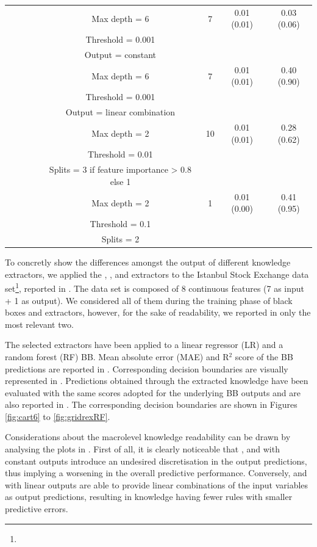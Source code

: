 \documentclass[sigconf]{acmart}
\begin{document}
\begin{table}[t]
\begin{tabular}{cccccccc}
		& & & \creepy{} & Max depth = 6 & 7 & 0.01 (0.01) & 0.03 (0.06) \\
		& & & & Threshold = 0.001 & & & \\
		& & & & Output = constant & & & \\
		\cmidrule(lr){4-8}
		& & & \creepy{} & Max depth = 6 & 7 & 0.01 (0.01) & 0.40 (0.90) \\
		& & & & Threshold = 0.001 & & & \\
		& & & & Output = linear combination & & & \\
		\cmidrule(lr){4-8}
		& & & \gridex{} & Max depth = 2 & 10 & 0.01 (0.01) & 0.28 (0.62) \\
		& & & & Threshold = 0.01 & & & \\
		& & & & Splits = 3 if feature importance > 0.8 else 1 & & & \\
		\cmidrule(lr){4-8}
		& & & \gridrex{} & Max depth = 2 & 1 & 0.01 (0.00) & 0.41 (0.95) \\
		& & & & Threshold = 0.1 & & & \\
		& & & & Splits = 2 & & & \\
		\bottomrule
	\end{tabular}
\end{table}

To concretly show the differences amongst the output of different knowledge extractors, we applied the \cart{}, \creepy{}, \gridex{} and \gridrex{} extractors to the Istanbul Stock Exchange data set\footnote{}, reported in .
%
The data set is composed of 8 continuous features (7 as input + 1 as output).
%
We considered all of them during the training phase of black boxes and extractors, however, for the sake of readability,  we reported in  only the most relevant two.

The selected extractors have been applied to a linear regressor (LR) and a random forest (RF) BB.
%
Mean absolute error (MAE) and R$^2$ score of the BB predictions are reported in .
%
Corresponding decision boundaries are visually represented in .
%
Predictions obtained through the extracted knowledge have been evaluated with the same scores adopted for the underlying BB outputs and are also reported in .
%
The corresponding decision boundaries are shown in Figures \ref{fig:cart6} to \ref{fig:gridrexRF}.

Considerations about the macrolevel knowledge readability can be drawn by analysing the plots in .
%
First of all, it is clearly noticeable that \cart{}, \gridex{} and \creepy{} with constant outputs introduce an undesired discretisation in the output predictions, thus implying a worsening in the overall predictive performance.
%
Conversely, \gridrex{} and \creepy{} with linear outputs are able to provide linear combinations of the input variables as output predictions, resulting in knowledge having fewer rules with smaller predictive errors.
\end{document}

